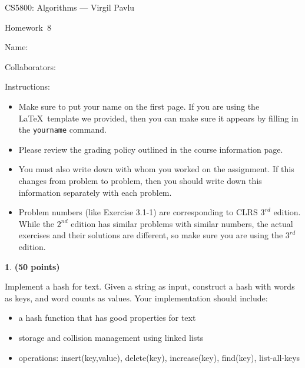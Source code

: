 \documentclass[11pt]{article}
\newcommand{\yourname}{}
\newcommand{\yourcollaborators}{}
\theoremstyle{definition}
\newcommand{\instructor}{Virgil Pavlu}
\newcommand{\hwnum}{8}
\newtheorem{prob}{}
\begin{document}
{\Large 
\begin{center}{CS5800: Algorithms} --- \instructor \end{center}}
{\large
\vspace{10pt}
\noindent Homework~\hwnum \vspace{2pt}%
}

\bigskip
{\large \noindent Name: \yourname }

{\large \noindent Collaborators: \yourcollaborators}

\vspace{15pt}

{\large \noindent Instructions:}

\begin{itemize}

\item Make sure to put your name on the first page.  If you are using the \LaTeX~template we provided, then you can make sure it appears by filling in the \texttt{yourname} command.

\item Please review the grading policy outlined in the course information page.

\item You must also write down with whom you worked on the assignment.  If this changes from problem to problem, then you should write down this information separately with each problem.

\item Problem numbers (like Exercise 3.1-1) are corresponding to CLRS $3^{rd}$ edition.  While the  $2^{nd}$ edition  has  similar  problems  with  similar  numbers,  the  actual  exercises  and their solutions are different, so make sure you are using the $3^{rd}$ edition.

\end{itemize}

\newpage



\begin{prob} \textbf{(50 points)}
\end{prob}

\noindent Implement a hash for text.  Given a string as input,  construct a hash with words as keys, and word counts as values.  Your implementation should include:

\begin{itemize}
\item a hash function that has good properties for text

\item storage and collision management using linked lists

\item operations:  insert(key,value), delete(key), increase(key), find(key), list-all-keys
\end{itemize}
\end{document}

